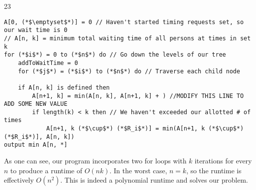 \documentclass{article}
\begin{document}
\begin{prob} {23}
	\begin{lstlisting}
A[0, (*$\emptyset$*)] = 0 // Haven't started timing requests set, so our wait time is 0
// A[n, k] = minimum total waiting time of all persons at times in set k 
for (*$i$*) = 0 to (*$n$*) do // Go down the levels of our tree
	addToWaitTime = 0
	for (*$j$*) = (*$i$*) to (*$n$*) do // Traverse each child node
		
	if A[n, k] is defined then
		A[n+1, k] = min(A[n, k], A[n+1, k] + ) //MODIFY THIS LINE TO ADD SOME NEW VALUE
		if length(k) < k then // We haven't exceeded our allotted # of times
			A[n+1, k (*$\cup$*) (*$R_i$*)] = min(A[n+1, k (*$\cup$*) (*$R_i$*)], A[n, k])
output min A[n, *]
	\end{lstlisting}
	
	As one can see, our program incorporates two for loops with $k$ iterations for every $n$ to produce a runtime of $O(nk)$.  In the worst case, $n = k$, so the runtime is effectively $O(n^2)$.  This is indeed a polynomial runtime and solves our problem.
\end{prob}
\end{document}
